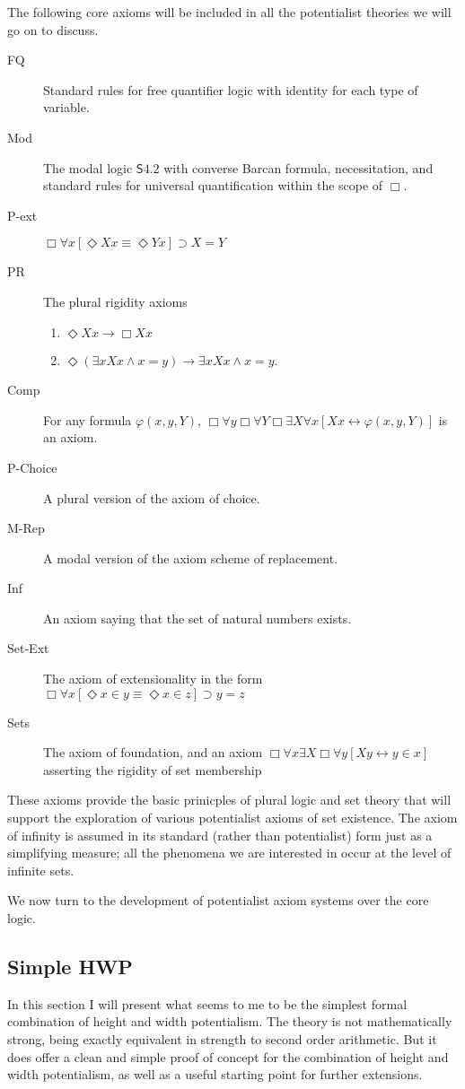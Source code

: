 \documentclass{article}
\begin{document}
The following core axioms will be included in all the potentialist theories we 
will go on to discuss.
\begin{description}
    \item[FQ] Standard rules for free quantifier logic 
    with identity for each type of variable.
    \item[Mod] The modal logic $\mathsf{S4.2}$ with converse Barcan formula,
    necessitation, and standard rules for universal quantification within the scope of $\Box$.  
    \item[P-ext] $\Box \forall x [\Diamond Xx \equiv \Diamond Yx] \supset X = Y$
    \item[PR] The plural rigidity axioms 
    \begin{enumerate} 
        \item $ \Diamond Xx \rightarrow \Box Xx$ 
        \item $ \Diamond (\exists x Xx \wedge x = y) \rightarrow \exists x Xx \wedge x = y$.
    \end{enumerate}
    \item[Comp] For any formula $\varphi(x, y, Y)$, 
    $\Box \forall y \Box \forall Y \Box \exists X \forall x [Xx \leftrightarrow \varphi(x, y, Y)]$ is an axiom.
    \item[P-Choice] A plural version of the axiom of choice.
    \item[M-Rep] A modal version of the axiom scheme of replacement.
    \item[Inf] An axiom saying that the set of natural numbers exists.
    \item[Set-Ext] The axiom of extensionality in the form 
    $\Box \forall x [\Diamond x \in y \equiv \Diamond x \in z] \supset y = z $
    \item[Sets] The axiom of foundation, and an axiom 
      $\Box \forall x \exists X \Box \forall y[Xy \leftrightarrow y \in x]$ asserting the rigidity of set membership
\end{description}
These axioms provide the basic prinicples of plural logic and set theory that will 
support the exploration of various potentialist axioms of set existence. The axiom 
of infinity is assumed in its standard (rather than potentialist) form just as a simplifying 
measure; all the phenomena we are interested in occur at the level of infinite sets.

We now turn to the development of potentialist axiom systems over the core logic.

\subsection{Simple HWP}
In this section I will present what seems to me to be the simplest formal combination 
of height and width potentialism. The theory is not mathematically strong, being 
exactly equivalent in strength to second order arithmetic. But it does offer a clean 
and simple proof of concept for the combination of height and width potentialism, 
as well as a useful starting point for further extensions.
\end{document}
